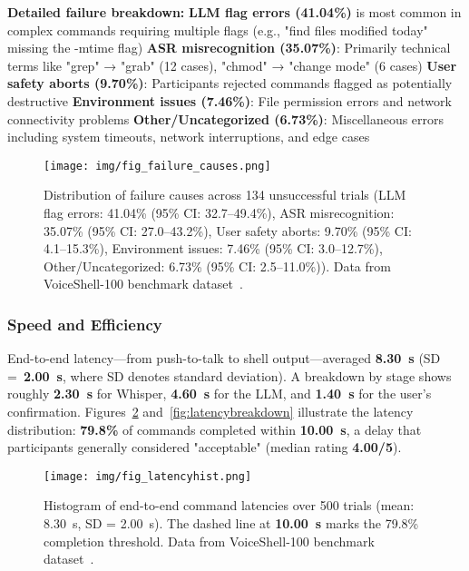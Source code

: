 \documentclass[a4paper,12pt]{article}
\begin{document}
\textbf{Detailed failure breakdown:}
\textbf{LLM flag errors (41.04\%)} is most common in complex commands requiring multiple flags (e.g., "find files modified today" missing the -mtime flag)
\textbf{ASR misrecognition (35.07\%)}: Primarily technical terms like "grep" → "grab" (12 cases), "chmod" → "change mode" (6 cases)
\textbf{User safety aborts (9.70\%)}: Participants rejected commands flagged as potentially destructive
\textbf{Environment issues (7.46\%)}: File permission errors and network connectivity problems
\textbf{Other/Uncategorized (6.73\%)}: Miscellaneous errors including system timeouts, network interruptions, and edge cases

\begin{figure}[H]
  \centering
  \texttt{[image: img/fig\_failure\_causes.png]}
  \caption{Distribution of failure causes across 134 unsuccessful trials (LLM flag errors: 41.04\% (95\% CI: 32.7–49.4\%), ASR misrecognition: 35.07\% (95\% CI: 27.0–43.2\%), User safety aborts: 9.70\% (95\% CI: 4.1–15.3\%), Environment issues: 7.46\% (95\% CI: 3.0–12.7\%), Other/Uncategorized: 6.73\% (95\% CI: 2.5–11.0\%)). Data from VoiceShell-100 benchmark dataset~\cite{ref26,ref27}.}
  \label{fig:failurecauses}
\end{figure}

\subsubsection{Speed and Efficiency}
End-to-end latency—from push-to-talk to shell output—averaged \textbf{8.30~s} (SD =~\textbf{2.00~s}, where SD denotes standard deviation). A breakdown by stage shows roughly \textbf{2.30~s} for Whisper, \textbf{4.60~s} for the LLM, and \textbf{1.40~s} for the user's confirmation. Figures~\ref{fig:latencyhist} and~\ref{fig:latencybreakdown} illustrate the latency distribution: \textbf{79.8\%} of commands completed within \textbf{10.00~s}, a delay that participants generally considered "acceptable" (median rating \textbf{4.00/5}).

\begin{figure}[htbp]
  \centering
  \texttt{[image: img/fig\_latencyhist.png]}
  \caption{Histogram of end-to-end command latencies over 500 trials (mean: 8.30~s, SD = 2.00~s). The dashed line at \textbf{10.00~s} marks the 79.8\% completion threshold. Data from VoiceShell-100 benchmark dataset~\cite{ref26,ref27}.}
  \label{fig:latencyhist}
\end{figure}
\end{document}
